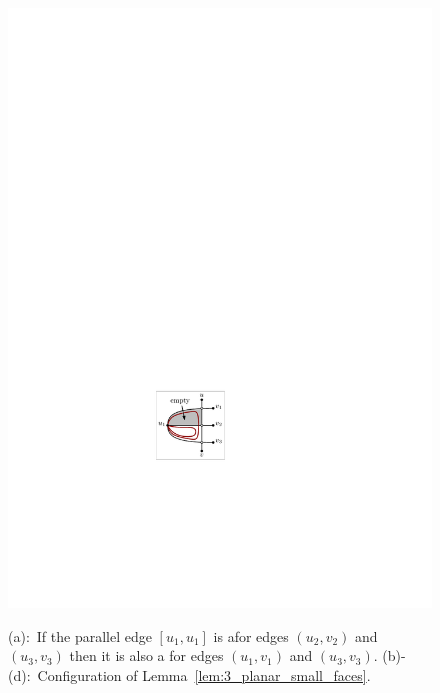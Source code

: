 \begin{figure}[htb]
\begin{minipage}[b]{.24\textwidth}
        \includegraphics[width=\textwidth,page=4]{images/3planar_small_faces}
        \subcaption{~}\label{fig:3_planar_small_faces_conf_middle_b}
    \end{minipage}
    \caption{%
    (a):~If the parallel edge $[u_1,u_1]$ is a\pe for edges $(u_2,v_2)$ and $(u_3,v_3)$ then it is also a \pe for edges $(u_1,v_1)$ and $(u_3,v_3)$.  (b)-(d):~Configuration of Lemma~\ref{lem:3_planar_small_faces}.}
    \label{fig:3_planar_small_faces}
\end{figure}

